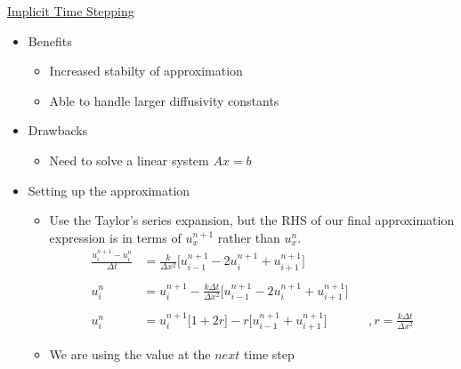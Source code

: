 \documentclass[compress]{beamer}
\begin{document}
\begin{frame}
\begin{center}
\underline{Implicit Time Stepping}
\end{center}
\begin{itemize}
\item Benefits
\begin{itemize}
\item Increased stabilty of approximation
\item Able to handle larger diffusivity constants
\end{itemize}
\item Drawbacks
\begin{itemize}
\item Need to solve a linear system  $Ax=b$
\end{itemize}
\end{itemize}
\end{frame}

\begin{frame}
\begin{itemize}
\item Setting up the approximation
\begin{itemize}
\item Use the Taylor's series expansion, but the RHS of our final approximation expression is in terms of $u_x^{n+1}$ rather than $u_x^{n}$. 
\begin{align*}
\frac{u_i^{n+1}-u_i^n}{\Delta t}	&=\frac{k}{\Delta x^2}\Big[u_{i-1}^{n+1}-2u_i^{n+1}+u_{i+1}^{n+1}\Big]	\\
									&																			\\
u_i^n								&=u_i^{n+1}-\frac{k\Delta t}{\Delta x^2}\Big[u_{i-1}^{n+1}-2u_i^{n+1}+u_{i+1}^{n+1}\Big] 	\\
									&																			\\
u_i^n								&=u_i^{n+1}\Big[1+2r\Big]-r\Big[u_{i-1}^{n+1}+u_{i+1}^{n+1}\Big]			&&,r=\frac{k\Delta t}{\Delta x^2}						
\end{align*}
\item We are using the value at the $next$ time step
\end{itemize}
\end{itemize}
\end{frame}
\end{document}
